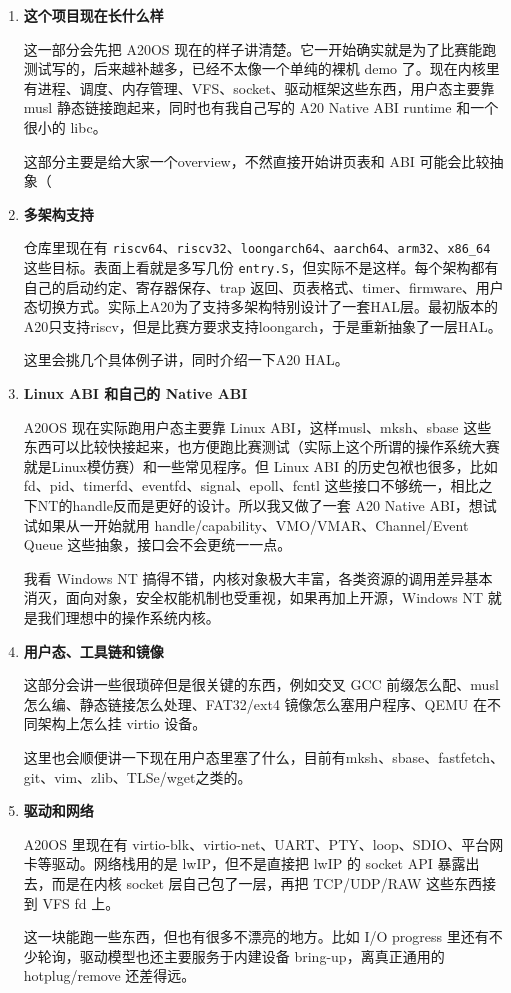 \documentclass[UTF8,zihao=-4]{ctexart}
\begin{document}
\begin{enumerate}
  \item \textbf{这个项目现在长什么样}

  这一部分会先把 A20OS 现在的样子讲清楚。它一开始确实就是为了比赛能跑测试写的，后来越补越多，已经不太像一个单纯的裸机 demo 了。现在内核里有进程、调度、内存管理、VFS、socket、驱动框架这些东西，用户态主要靠 musl 静态链接跑起来，同时也有我自己写的 A20 Native ABI runtime 和一个很小的 libc。

  这部分主要是给大家一个overview，不然直接开始讲页表和 ABI 可能会比较抽象（

  \item \textbf{多架构支持}

  仓库里现在有 \texttt{riscv64}、\texttt{riscv32}、\texttt{loongarch64}、\texttt{aarch64}、\texttt{arm32}、\texttt{x86\_64} 这些目标。表面上看就是多写几份 \texttt{entry.S}，但实际不是这样。每个架构都有自己的启动约定、寄存器保存、trap 返回、页表格式、timer、firmware、用户态切换方式。实际上A20为了支持多架构特别设计了一套HAL层。最初版本的A20只支持riscv，但是比赛方要求支持loongarch，于是重新抽象了一层HAL。  

  这里会挑几个具体例子讲，同时介绍一下A20 HAL。

  \item \textbf{Linux ABI 和自己的 Native ABI}

  A20OS 现在实际跑用户态主要靠 Linux ABI，这样musl、mksh、sbase 这些东西可以比较快接起来，也方便跑比赛测试（实际上这个所谓的操作系统大赛就是Linux模仿赛）和一些常见程序。但 Linux ABI 的历史包袱也很多，比如 fd、pid、timerfd、eventfd、signal、epoll、fcntl 这些接口不够统一，相比之下NT的handle反而是更好的设计。所以我又做了一套 A20 Native ABI，想试试如果从一开始就用 handle/capability、VMO/VMAR、Channel/Event Queue 这些抽象，接口会不会更统一一点。
  
  我看 Windows NT 搞得不错，内核对象极大丰富，各类资源的调用差异基本消灭，面向对象，安全权能机制也受重视，如果再加上开源，Windows NT 就是我们理想中的操作系统内核。

  \item \textbf{用户态、工具链和镜像}

  这部分会讲一些很琐碎但是很关键的东西，例如交叉 GCC 前缀怎么配、musl 怎么编、静态链接怎么处理、FAT32/ext4 镜像怎么塞用户程序、QEMU 在不同架构上怎么挂 virtio 设备。
  
  这里也会顺便讲一下现在用户态里塞了什么，目前有mksh、sbase、fastfetch、git、vim、zlib、TLSe/wget之类的。

  \item \textbf{驱动和网络}

  A20OS 里现在有 virtio-blk、virtio-net、UART、PTY、loop、SDIO、平台网卡等驱动。网络栈用的是 lwIP，但不是直接把 lwIP 的 socket API 暴露出去，而是在内核 socket 层自己包了一层，再把 TCP/UDP/RAW 这些东西接到 VFS fd 上。

  这一块能跑一些东西，但也有很多不漂亮的地方。比如 I/O progress 里还有不少轮询，驱动模型也还主要服务于内建设备 bring-up，离真正通用的 hotplug/remove 还差得远。

\end{enumerate}
\end{document}
